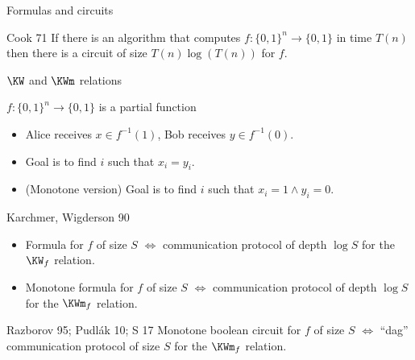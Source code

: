 \begin{frame}{Formulas and circuits}

    \begin{minipage}{0.48\linewidth}
        
    \end{minipage}
    \begin{minipage}{0.48\linewidth}
        
    \end{minipage}

    \pause
    \pause
    \begin{block}{Cook 71}
        If there is an algorithm that computes $f: \{0, 1\}^n \to \{0, 1\}$ in time $T(n)$ then there is
        a circuit of size $T(n) \log(T(n))$ for $f$.
    \end{block}

\end{frame}


\begin{frame}{$\KW$ and $\KWm$ relations}

    $f:\{0, 1\}^n \to \{0, 1\}$ is a partial function
    
    \begin{itemize}
        \item Alice receives $x \in f^{-1}(1)$, Bob receives $y \in f^{-1}(0)$.
        \item Goal is to find $i$ such that $x_i = y_i$.
            \pause
        \item (Monotone version) Goal is to find $i$ such that $x_i = 1 \land y_i = 0$.
    \end{itemize}

    \pause
    \begin{block}{Karchmer, Wigderson 90}
        \begin{itemize}
            \item Formula for $f$ of size $S$ $\Leftrightarrow$ communication protocol of depth $\log S$
                for the $\KW_f$ relation.
            \item<4-> Monotone formula for $f$ of size $S$ $\Leftrightarrow$ communication protocol of
                depth $\log S$ for the $\KWm_f$ relation. 
        \end{itemize}
    \end{block}

    \pause
    \pause
    \begin{block}{Razborov 95; Pudl{\'{a}}k 10; S 17}
        Monotone boolean circuit for $f$ of size $S$ $\Leftrightarrow$ ``dag'' communication protocol of
        size $S$ for the $\KWm_f$ relation.        
    \end{block}
\end{frame}

